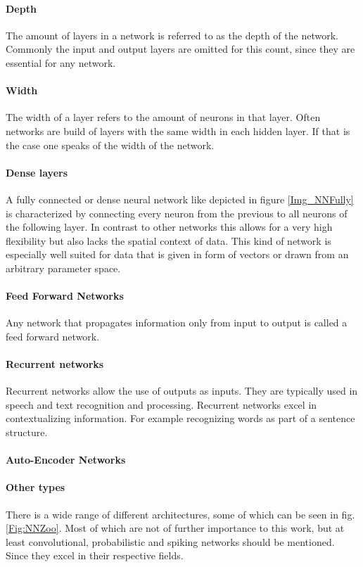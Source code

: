 			\paragraph{Depth}
			The amount of layers in a network is referred to as the depth of the network. Commonly the input and output layers are omitted for this count, since they are essential for any network.
			\paragraph{Width}
			The width of a layer refers to the amount of neurons in that layer. Often networks are build of layers with the same width in each hidden layer. If that is the case one speaks of the width of the network.
			\paragraph{Dense layers}
			A fully connected or dense neural network like depicted in figure \ref{Img_NNFully} is characterized by connecting every neuron from the previous to all neurons of the following layer. In contrast to other networks this allows for a very high flexibility but also lacks the spatial context of data. This kind of network is especially well suited for data that is given in form of vectors or drawn from an arbitrary parameter space.
			\paragraph{Feed Forward Networks}
			Any network that propagates information only from input to output is called a feed forward network.
			\paragraph{Recurrent networks} Recurrent networks allow the use of outputs as inputs. They are typically used in speech and text recognition and processing. Recurrent networks excel in contextualizing information. For example recognizing words as part of a sentence structure.
			\paragraph{Auto-Encoder Networks}
				
			\paragraph{Other types}
				There is a wide range of different architectures, some of which can be seen in fig. \ref{Fig:NNZoo}. Most of which are not of further importance to this work, but at least convolutional, probabilistic and spiking networks should be mentioned. Since they excel in their respective fields.
			
